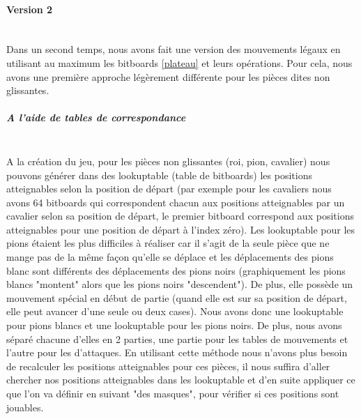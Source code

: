 \huge\documentclass{article}
\begin{document}
    \paragraph{Version 2} \label{mouvements_legaux_v2}
    ~~\\
    \newline
    Dans un second temps, nous avons fait une version des mouvements légaux en utilisant au maximum les bitboards \ref{plateau} et leurs opérations.
    Pour cela, nous avons une première approche légèrement différente pour les pièces dites non glissantes.
    \subparagraph{A l'aide de tables de correspondance} \label{tables_de_correspondances}
    ~~\\
    \newline
    A la création du jeu, pour les pièces non glissantes (roi, pion, cavalier) nous pouvons générer dans des lookuptable (table de bitboards) les positions atteignables selon la position de départ (par exemple pour les cavaliers nous avons 64 bitboards qui correspondent chacun aux positions atteignables par un cavalier selon sa position de départ, le premier bitboard correspond aux positions atteignables pour une position de départ à l'index zéro).\newline
    Les lookuptable pour les pions étaient les plus difficiles à réaliser car il s'agit de la seule pièce que ne mange pas de la même façon qu'elle se déplace et les déplacements des pions blanc sont différents des déplacements des pions noirs (graphiquement les pions blancs "montent" alors que les pions noirs "descendent"). \newline
    De plus, elle possède un mouvement spécial en début de partie (quand elle est sur sa position de départ, elle peut avancer d'une seule ou deux cases).\newline
    Nous avons donc une lookuptable pour pions blancs et une lookuptable pour les pions noirs.\newline
    De plus, nous avons séparé chacune d'elles en 2 parties, une partie pour les tables de mouvements et l'autre pour les d'attaques.\newline
    En utilisant cette méthode nous n'avons plus besoin de recalculer les positions atteignables pour ces pièces, il nous suffira d'aller chercher nos positions atteignables dans les lookuptable et d'en suite appliquer ce que l'on va définir en suivant "des masques", pour vérifier si ces positions sont jouables.
\end{document}
